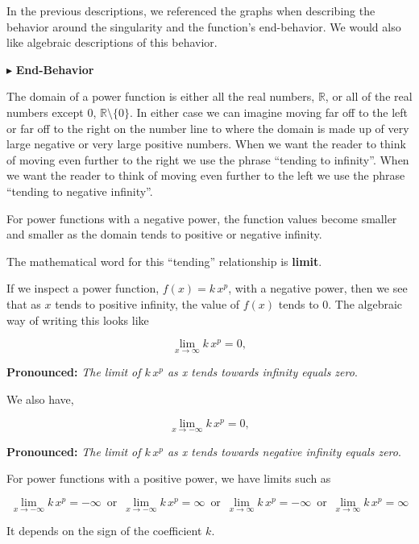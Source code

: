 \documentclass{ximera}
\begin{document}
In the previous descriptions, we referenced the graphs when describing the behavior around the singularity and the function's end-behavior.  We would also like algebraic descriptions of this behavior.


$\blacktriangleright$  \textbf{End-Behavior}

The domain of a power function is either all the real numbers, $\mathbb{R}$, or all of the real numbers except $0$, $\mathbb{R} \setminus \{ 0 \}$.  In either case we can imagine moving far off to the left or far off to the right on the number line to where the domain is made up of very large negative or very large positive numbers.  When we want the reader to think of moving even further to the right we use the phrase ``tending to infinity''. When we want the reader to think of moving even further to the left we use the phrase ``tending to negative infinity''.

For power functions with a negative power, the function values become smaller and smaller as the domain tends to positive or negative infinity.

The mathematical word for this ``tending'' relationship is \textbf{\textcolor{purple!85!blue}{limit}}.

If we inspect a power function, $f(x) = k \, x^p$, with a negative power, then we see that as $x$ tends to positive infinity, the value of $f(x)$ tends to $0$.  The algebraic way of writing this looks like


\[    \lim_{x \to \infty} k \, x^p = 0,        \]


\textbf{\textcolor{blue!55!black}{Pronounced:}} \textit{The limit of $k \, x^p$ as x tends towards infinity equals zero}.


We also have,

\[    \lim_{x \to -\infty} k \, x^p = 0,        \]


\textbf{\textcolor{blue!55!black}{Pronounced:}} \textit{The limit of $k \, x^p$ as x tends towards negative infinity equals zero}.


For power functions with a positive power, we have limits such as 



\[    \lim_{x \to -\infty} k \, x^p =  -\infty  \,   \text{ or }  \,  \lim_{x \to -\infty} k \, x^p =  \infty  \,   \text{ or }  \,     \lim_{x \to \infty} k \, x^p = -\infty  \,  \text{ or }  \,     \lim_{x \to \infty} k \, x^p = \infty  \]




It depends on the sign of the coefficient $k$.
\end{document}
